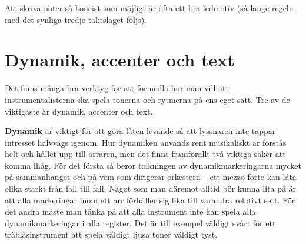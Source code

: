 Att skriva noter så koncist som möjligt är ofta ett bra ledmotiv (så länge regeln med det synliga tredje taktslaget följs).

\vspace{2em}
\noindent{}

\newpage
\section{Dynamik, accenter och text}
Det finns många bra verktyg för att förmedla hur man vill att instrumentalisterna ska spela tonerna och rytmerna på ens eget sätt. Tre av de viktigaste är dynamik, accenter och text.

\vspace{1em}
\textbf{Dynamik} är viktigt för att göra låten levande så att lyssnaren inte tappar intresset halvvägs igenom. Hur dynamiken används rent musikaliskt är förstås helt och hållet upp till arraren, men det finns framförallt två viktiga saker att komma ihåg. För det första så beror tolkningen av dynamikmarkeringarna mycket på sammanhanget och på vem som dirigerar orkestern – ett mezzo forte kan låta olika starkt från fall till fall. Något som man däremot alltid bör kunna lita på är att alla markeringar inom ett arr förhåller sig lika till varandra relativt sett. För det andra måste man tänka på att alla instrument inte kan spela alla dynamikmarkeringar i alla register. Det är till exempel väldigt svårt för ett träblåsinstrument att spela väldigt ljusa toner väldigt tyst.

